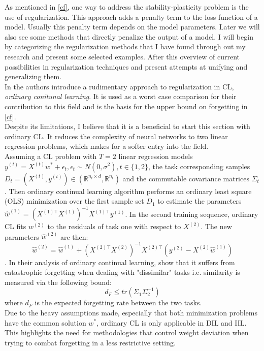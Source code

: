 As mentioned in \autoref{cf}, one way to address the stability-plasticity problem is the use of regularization. This approach adds a penalty term to the loss function of a model. Usually this penalty term depends on the model parameters. Later we will also see some methods that directly penalize the output of a model. I will begin by categorizing the regularization methods that I have found through out my research and present some selected examples. After this overview of current possibilities in regularization techniques and present attempts at unifying and generalizing them.\\
In \cite{evron2022,li2024fixeddesignanalysisregularizationbased} the authors introduce a rudimentary approach to regularization in CL, \textit{ordinary conitunal learning}. It is used as a worst case comparison for their contribution to this field and is the basis for the upper bound on forgetting in \autoref{cf}.\\
Despite its limitations, I believe that it is a beneficial to start this section with ordinary CL. It reduces the complexity of neural networks to two linear regression problems, which makes for a softer entry into the field.\\
Assuming a CL problem with $T=2$ linear regression models $y^{(t)} = X^{(t)}w^* + \epsilon_t, \epsilon_t \sim N(0, \sigma^2), t \in \{1,2\}$, the task corresponding samples $D_t = (X^{(t)}, y^{(t)}) \in (\mathbb{R}^{n_t \times d}, \mathbb{R}^{n_t})$ and the commutable covariance matrices $\Sigma_t$. Then ordinary continual learning algorithm performs an ordinary least square (OLS) minimization over the first sample set $D_1$ to estimate the parameters $\hat{w}^{(1)} = (X^{(1)\top}X^{(1)})^{-1}X^{(1)\top} y^{(1)}$. In the second training sequence, ordinary CL fits $w^{(2)}$ to the residuals of task one with respect to $X^{(2)}$. The new parameters $\hat{w}^{(2)}$ are then:
\begin{equation}
	\hat{w}^{(2)} = \hat{w}^{(1)} + (X^{(2)\top}X^{(2)})^{-1}X^{(2)\top} (y^{(2)} - X^{(2)}\hat{w}^{(1)})
\end{equation}.
In their analysis of ordinary continual learning, \cite{li2024fixeddesignanalysisregularizationbased} show that it suffers from catastrophic forgetting when dealing with "dissimilar" tasks i.e. similarity is measured via the following bound:
\begin{equation}
	d_F \leq tr(\Sigma_1\Sigma_2^{-1})
\end{equation}
where $d_F$ is the expected forgetting rate between the two tasks.\\
Due to the heavy assumptions made, especially that both minimization problems have the common solution $w^*$, ordinary CL is only applicable in DIL and IIL. This highlights the need for methodologies that control weight deviation when trying to combat forgetting in a less restrictive setting.

